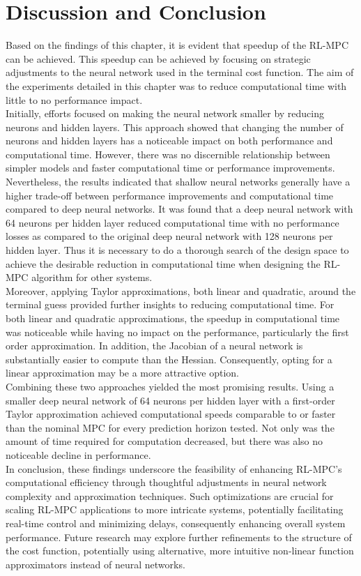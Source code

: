 \section{Discussion and Conclusion}

Based on the findings of this chapter, it is evident that speedup of the RL-MPC can be achieved. This speedup can be achieved by focusing on strategic adjustments to the neural network used in the terminal cost function. The aim of the experiments detailed in this chapter was to reduce computational time with little to no performance impact.\\
Initially, efforts focused on making the neural network smaller by reducing neurons and hidden layers. This approach showed that changing the number of neurons and hidden layers has a noticeable impact on both performance and computational time. However, there was no discernible relationship between simpler models and faster computational time or performance improvements. Nevertheless, the results indicated that shallow neural networks generally have a higher trade-off between performance improvements and computational time compared to deep neural networks. It was found that a deep neural network with 64 neurons per hidden layer reduced computational time with no performance losses as compared to the original deep neural network with 128 neurons per hidden layer. Thus it is necessary to do a thorough search of the design space to achieve the desirable reduction in computational time when designing the RL-MPC algorithm for other systems.\\
Moreover, applying Taylor approximations, both linear and quadratic, around the terminal guess provided further insights to reducing computational time. For both linear and quadratic approximations, the speedup in computational time was noticeable while having no impact on the performance, particularly the first order approximation. In addition, the Jacobian of a neural network is substantially easier to compute than the Hessian. Consequently, opting for a linear approximation may be a more attractive option.\\
Combining these two approaches yielded the most promising results. Using a smaller deep neural network of 64 neurons per hidden layer with a first-order Taylor approximation achieved computational speeds comparable to or faster than the nominal MPC for every prediction horizon tested. Not only was the amount of time required for computation decreased, but there was also no noticeable decline in performance.\\
In conclusion, these findings underscore the feasibility of enhancing RL-MPC's computational efficiency through thoughtful adjustments in neural network complexity and approximation techniques. Such optimizations are crucial for scaling RL-MPC applications to more intricate systems, potentially facilitating real-time control and minimizing delays, consequently enhancing overall system performance. Future research may explore further refinements to the structure of the cost function, potentially using alternative, more intuitive non-linear function approximators instead of neural networks.



